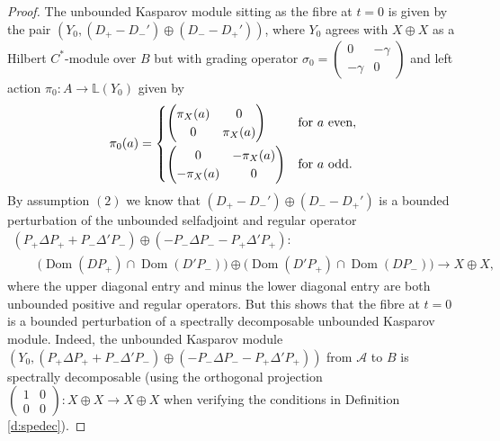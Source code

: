 \documentclass[11pt]{article}
\numberwithin{equation}{section}
\newcommand{\op}{\oplus}
\newcommand{\ga}{\gamma}
\newcommand{\De}{\Delta}
\newcommand{\si}{\sigma}
\newcommand{\s}[1]{\mathscr{#1}}
\newcommand{\B}[1]{\mathbb{#1}}
\begin{document}
\begin{proof}
The unbounded Kasparov module sitting as the fibre at $t = 0$ is given by the pair $( Y_0, (D_+ - D_-') \op (D_- - D_+') )$, where $Y_0$ agrees with $X \op X$ as a Hilbert $C^*$-module over $B$ but with grading operator $\si_0 = \left(\begin{smallmatrix} 0 & - \ga \\ - \ga & 0\end{smallmatrix}\right)$ and left action $\pi_0\colon A \to \B L(Y_0)$ given by
\[
\pi_0(a) = \begin{cases} \left(\begin{matrix} \pi_X(a) & 0 \\ 0 & \pi_X(a)\end{matrix}\right) & \text{for} \ a \text{ even}, \vspace{1mm}\\ \left(\begin{matrix} 0 & -\pi_X(a) \\ -\pi_X(a) & 0\end{matrix}\right) & \text{for} \ a \text{ odd} .\end{cases}
\]
By assumption $(2)$ we know that $(D_+ - D_-') \op (D_- - D_+')$ is a bounded perturbation of the unbounded selfadjoint and regular operator
\begin{gather*}
 ( P_+ \De P_+ + P_- \De' P_- ) \op ( - P_- \De P_- - P_+ \De' P_+)\colon \\
\qquad {}\big( \operatorname{Dom}( DP_+) \cap \operatorname{Dom}( D' P_-) \big) \op \big( \operatorname{Dom}( D'P_+) \cap \operatorname{Dom}( D P_-) \big) \to X \op X ,
\end{gather*}
where the upper diagonal entry and minus the lower diagonal entry are both unbounded positive and regular operators. But this shows that the fibre at $t = 0$ is a bounded perturbation of a spectrally decomposable unbounded Kasparov module. Indeed, the unbounded Kasparov module $( Y_0, ( P_+ \De P_+ + P_- \De' P_- ) \op ( - P_- \De P_- - P_+ \De' P_+) )$ from $\s A$ to $B$ is spectrally decomposable (using the orthogonal projection $\left(\begin{smallmatrix} 1 & 0 \\ 0 & 0\end{smallmatrix}\right)\colon X \op X \to X \op X$ when verifying the conditions in Definition \ref{d:spedec}).
\end{proof}
\end{document}
